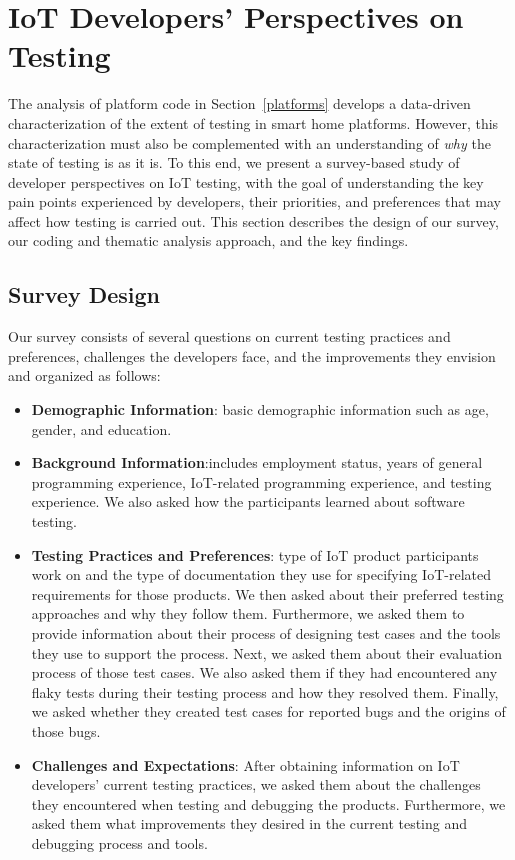 \section{IoT Developers' Perspectives on Testing}\label{sec:survey}


The analysis of platform code in Section~\ref{platforms} develops a data-driven characterization of the extent of testing in smart home platforms. 
However, this characterization must also be complemented with an understanding of {\em why} the state of testing is as it is.
To this end, we present a survey-based study of developer perspectives on IoT testing, with the goal of understanding the key pain points experienced by developers, their priorities, and preferences that may affect how testing is carried out. 
This section describes the design of our survey, our coding and thematic analysis approach, and the key findings.






\subsection{Survey Design} 
Our survey consists of several questions on current testing practices and preferences, challenges the developers face, and the improvements they envision and organized as follows:

\begin{itemize}[wide, labelwidth=0pt, labelindent=0pt]
\item {\bf Demographic Information}: basic demographic information such as age, gender, and education.
\item {\bf Background Information}:includes employment status, years of general programming experience, IoT-related programming experience, and testing experience. We also asked how the participants learned about software testing. %
\item {\bf Testing Practices and Preferences}:  type of IoT product participants work on and the type of documentation they use for specifying IoT-related requirements for those products. We then asked about their preferred testing approaches and why they follow them. Furthermore, we asked them to provide information about their process of designing test cases and the tools they use to support the process. Next, we asked them about their evaluation process of those test cases. We also asked them if they had encountered any flaky tests during their testing process and how they resolved them. Finally, we asked whether they created test cases for reported bugs and the origins of those bugs. \item {\bf Challenges and Expectations}: After obtaining information on IoT developers' current testing practices, we asked them about the challenges they encountered when testing and debugging the products. Furthermore, we asked them what improvements they desired in the current testing and debugging process and tools. 
\end{itemize}

